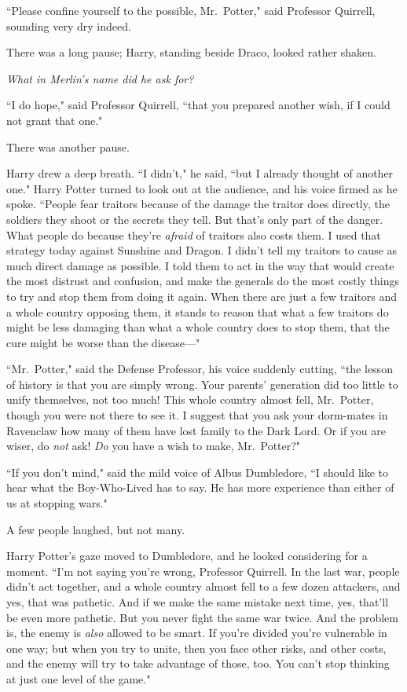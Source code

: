 ``Please confine yourself to the possible, Mr.~Potter," said Professor Quirrell, sounding very dry indeed.

There was a long pause; Harry, standing beside Draco, looked rather shaken.

\emph{What in Merlin's name did he ask for?}

``I do hope," said Professor Quirrell, ``that you prepared another wish, if I could not grant that one."

There was another pause.

Harry drew a deep breath. ``I didn't," he said, ``but I already thought of another one." Harry Potter turned to look out at the audience, and his voice firmed as he spoke. ``People fear traitors because of the damage the traitor does directly, the soldiers they shoot or the secrets they tell. But that's only part of the danger. What people do because they're \emph{afraid} of traitors also costs them. I used that strategy today against Sunshine and Dragon. I didn't tell my traitors to cause as much direct damage as possible. I told them to act in the way that would create the most distrust and confusion, and make the generals do the most costly things to try and stop them from doing it again. When there are just a few traitors and a whole country opposing them, it stands to reason that what a few traitors do might be less damaging than what a whole country does to stop them, that the cure might be worse than the disease---"

``Mr.~Potter," said the Defense Professor, his voice suddenly cutting, ``the lesson of history is that you are simply wrong. Your parents' generation did too little to unify themselves, not too much! This whole country almost fell, Mr.~Potter, though you were not there to see it. I suggest that you ask your dorm-mates in Ravenclaw how many of them have lost family to the Dark Lord. Or if you are wiser, do \emph{not} ask! \emph{Do} you have a wish to make, Mr.~Potter?"

``If you don't mind," said the mild voice of Albus Dumbledore, ``I should like to hear what the Boy-Who-Lived has to say. He has more experience than either of us at stopping wars."

A few people laughed, but not many.

Harry Potter's gaze moved to Dumbledore, and he looked considering for a moment. ``I'm not saying you're wrong, Professor Quirrell. In the last war, people didn't act together, and a whole country almost fell to a few dozen attackers, and yes, that was pathetic. And if we make the same mistake next time, yes, that'll be even more pathetic. But you never fight the same war twice. And the problem is, the enemy is \emph{also} allowed to be smart. If you're divided you're vulnerable in one way; but when you try to unite, then you face other risks, and other costs, and the enemy will try to take advantage of those, too. You can't stop thinking at just one level of the game."

